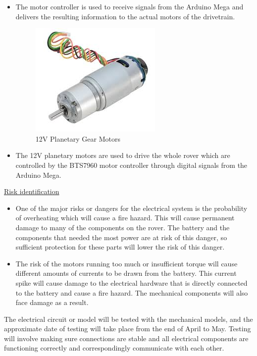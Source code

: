 \documentclass[a4paper, 10pt]{article}
\begin{document}
\begin{itemize}
		\item The motor controller is used to receive signals from the Arduino Mega and delivers the resulting information to the actual motors of the drivetrain.

		\begin{figure} [!h]
			\centering
			\includegraphics[scale=0.25]{Photos/Gear motor 12V planetary}
			\caption{12V Planetary Gear Motors}
		\end{figure}

		\item The 12V planetary motors are used to drive the whole rover which are controlled by the BTS7960 motor controller through digital signals from the Arduino Mega.
		\end{itemize}


		\underline{Risk identification}

		\begin{itemize}
		\item
		One of the major risks or dangers for the electrical system is the probability of overheating which will cause a fire hazard. This will cause permanent damage to many of the components on the rover. The battery and the components that needed the most power are at risk of this danger, so sufficient protection for these parts will lower the risk of this danger.

		\item
		The risk of the motors running too much or insufficient torque will cause different amounts of currents to be drawn from the battery. This current spike will cause damage to the electrical hardware that is directly connected to the battery and cause a fire hazard. The mechanical components will also face damage as a result.
		\end{itemize}

		The electrical circuit or model will be tested with the mechanical models, and the approximate date of testing will take place from the end of April to May. Testing will involve making sure connections are stable and all electrical components are functioning correctly and correspondingly communicate with each other. 
		
\end{document}
